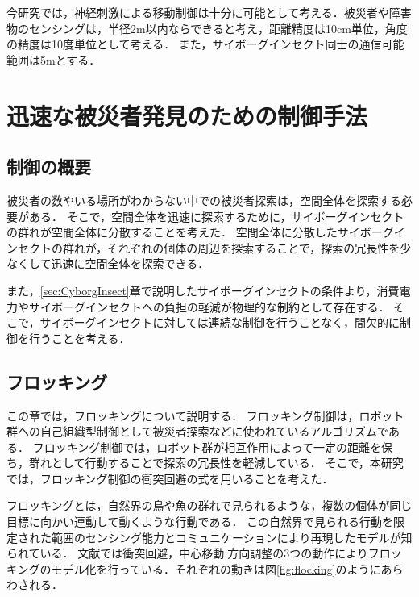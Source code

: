 \documentclass[a4paper,11pt]{jarticle}
\begin{document}
	今研究では，神経刺激による移動制御は十分に可能として考える．被災者や障害物のセンシングは，半径2m以内ならできると考え，距離精度は10cm単位，角度の精度は10度単位として考える．
	また，サイボーグインセクト同士の通信可能範囲は5mとする．
	
	\section{迅速な被災者発見のための制御手法}
	\label{sec:control}
	\subsection{制御の概要}
	被災者の数やいる場所がわからない中での被災者探索は，空間全体を探索する必要がある．
	そこで，空間全体を迅速に探索するために，サイボーグインセクトの群れが空間全体に分散することを考えた．
	空間全体に分散したサイボーグインセクトの群れが，それぞれの個体の周辺を探索することで，探索の冗長性を少なくして迅速に空間全体を探索できる．
	
	また，\ref{sec:CyborgInsect}章で説明したサイボーグインセクトの条件より，消費電力やサイボーグインセクトへの負担の軽減が物理的な制約として存在する．
	そこで，サイボーグインセクトに対しては連続な制御を行うことなく，間欠的に制御を行うことを考える．
	\subsection{フロッキング}
	\label{sec:flocking}
	この章では，フロッキングについて説明する．
	フロッキング制御は，ロボット群への自己組織型制御として被災者探索などに使われているアルゴリズムである．
	フロッキング制御では，ロボット群が相互作用によって一定の距離を保ち，群れとして行動することで探索の冗長性を軽減している．
	そこで，本研究では，フロッキング制御の衝突回避の式を用いることを考えた．
	
	フロッキングとは，自然界の鳥や魚の群れで見られるような，複数の個体が同じ目標に向かい連動して動くような行動である．
	この自然界で見られる行動を限定された範囲のセンシング能力とコミュニケーションにより再現したモデルが知られている．
	文献\cite{steering}では衝突回避，中心移動,方向調整の3つの動作によりフロッキングのモデル化を行っている．それぞれの動きは図\ref{fig:flocking}のようにあらわされる．
	
\end{document}
